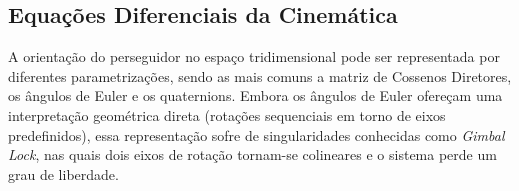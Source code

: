 \subsection{Equações Diferenciais da Cinemática}
\label{sec_equacoes_cinematica}

A orientação do perseguidor no espaço tridimensional pode ser representada por diferentes parametrizações, sendo as mais comuns a matriz de Cossenos Diretores, os ângulos de Euler e os quaternions.
Embora os ângulos de Euler ofereçam uma interpretação geométrica direta (rotações sequenciais em torno de eixos predefinidos), essa representação sofre de singularidades conhecidas como \emph{Gimbal Lock}, nas quais dois eixos de rotação tornam-se colineares e o sistema perde um grau de liberdade.







